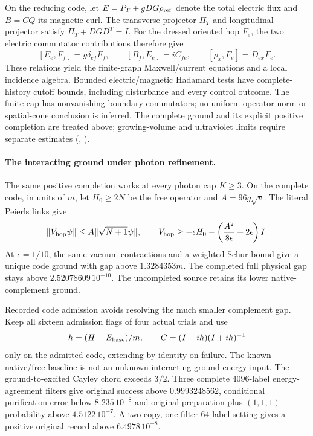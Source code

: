 On the reducing code, let $E=P_T+gDG\rho_{\rm ref}$ denote the total
electric flux and $B=CQ$ its magnetic curl. The transverse projector
$\Pi_T$ and longitudinal projector satisfy
$\Pi_T+DGD^T=I$. For the dressed oriented hop $F_e$, the two electric
commutator contributions therefore give
\[
 [E_e,F_f]=g\delta_{ef}F_f,\qquad [B_f,E_e]=iC_{fe},\qquad
 [\rho_x,F_e]=D_{ex}F_e.
\]
These relations yield the finite-graph Maxwell/current equations and
a local incidence algebra. Bounded electric/magnetic Hadamard tests
have complete-history cutoff bounds, including disturbance and every
control outcome. The finite cap has nonvanishing boundary commutators;
no uniform operator-norm or spatial-cone conclusion is inferred.
The complete ground and its explicit positive completion are treated above;
growing-volume and ultraviolet limits require separate estimates
(, \cite{ophrepo}).

\paragraph{The interacting ground under photon refinement.}
The same positive completion works at every photon cap $K\ge3$.
On the complete code, in units of $m$, let $H_0\ge2N$ be the free
operator and $A=96g\sqrt v$. The literal Peierls links give
\[
 \|V_{\rm hop}\psi\|\le A\|\sqrt{N+1}\psi\|,\qquad
 V_{\rm hop}\ge-\epsilon H_0-
 \left(\frac{A^2}{8\epsilon}+2\epsilon\right)I.
\]
At $\epsilon=1/10$, the same vacuum contractions and a weighted Schur
bound give a unique code ground with gap above $1.3284353m$.
The completed full physical gap stays above $2.52078609\,10^{-10}$.
The uncompleted source retains its lower native-complement ground.

Recorded code admission avoids resolving the much smaller complement gap.
Keep all sixteen admission flags of four actual trials and use
\[
 h=(H-E_{\rm base})/m,\qquad C=(I-ih)(I+ih)^{-1}
\]
only on the admitted code, extending by identity on failure. The known
native/free baseline is not an unknown interacting ground-energy input.
The ground-to-excited Cayley chord exceeds $3/2$. Three complete
$4096$-label energy-agreement filters give original success above
$0.9993248562$, conditional purification error below $8.235\,10^{-8}$
and original preparation-plus-$(1,1,1)$ probability above
$4.5122\,10^{-7}$. A two-copy, one-filter $64$-label setting
gives a positive original record above $6.4978\,10^{-8}$.

